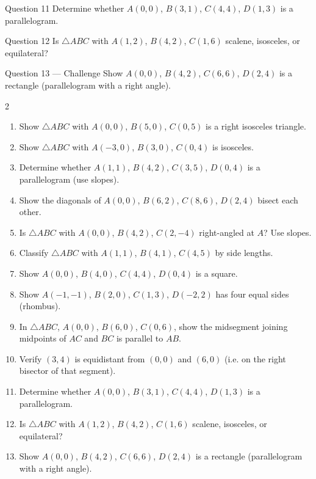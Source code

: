 \documentclass[11pt]{article}
\begin{document}
\begin{qbox}{Question 11}
Determine whether $A(0,0)$, $B(3,1)$, $C(4,4)$, $D(1,3)$ is a parallelogram.\workspace{2.6cm}
\end{qbox}

\begin{qbox}{Question 12}
Is $\triangle ABC$ with $A(1,2)$, $B(4,2)$, $C(1,6)$ scalene, isosceles, or equilateral?\workspace{2.6cm}
\end{qbox}

\begin{qbox}{Question 13 --- Challenge}
Show $A(0,0)$, $B(4,2)$, $C(6,6)$, $D(2,4)$ is a rectangle (parallelogram with a right angle).\workspace{3.2cm}
\end{qbox}

\clearpage
{}

\begin{recapbox}
\begin{multicols}{2}
\small
\begin{enumerate}[leftmargin=*,itemsep=3pt]
  \item Show $\triangle ABC$ with $A(0,0)$, $B(5,0)$, $C(0,5)$ is a right isosceles triangle.
  \item Show $\triangle ABC$ with $A(-3,0)$, $B(3,0)$, $C(0,4)$ is isosceles.
  \item Determine whether $A(1,1)$, $B(4,2)$, $C(3,5)$, $D(0,4)$ is a parallelogram (use slopes).
  \item Show the diagonals of $A(0,0)$, $B(6,2)$, $C(8,6)$, $D(2,4)$ bisect each other.
  \item Is $\triangle ABC$ with $A(0,0)$, $B(4,2)$, $C(2,-4)$ right-angled at $A$? Use slopes.
  \item Classify $\triangle ABC$ with $A(1,1)$, $B(4,1)$, $C(4,5)$ by side lengths.
  \item Show $A(0,0)$, $B(4,0)$, $C(4,4)$, $D(0,4)$ is a square.
  \item Show $A(-1,-1)$, $B(2,0)$, $C(1,3)$, $D(-2,2)$ has four equal sides (rhombus).
  \item In $\triangle ABC$, $A(0,0)$, $B(6,0)$, $C(0,6)$, show the midsegment joining midpoints of $AC$ and $BC$ is parallel to $AB$.
  \item Verify $(3,4)$ is equidistant from $(0,0)$ and $(6,0)$ (i.e. on the right bisector of that segment).
  \item Determine whether $A(0,0)$, $B(3,1)$, $C(4,4)$, $D(1,3)$ is a parallelogram.
  \item Is $\triangle ABC$ with $A(1,2)$, $B(4,2)$, $C(1,6)$ scalene, isosceles, or equilateral?
  \item Show $A(0,0)$, $B(4,2)$, $C(6,6)$, $D(2,4)$ is a rectangle (parallelogram with a right angle).
\end{enumerate}
\end{multicols}
\end{recapbox}
\end{document}
